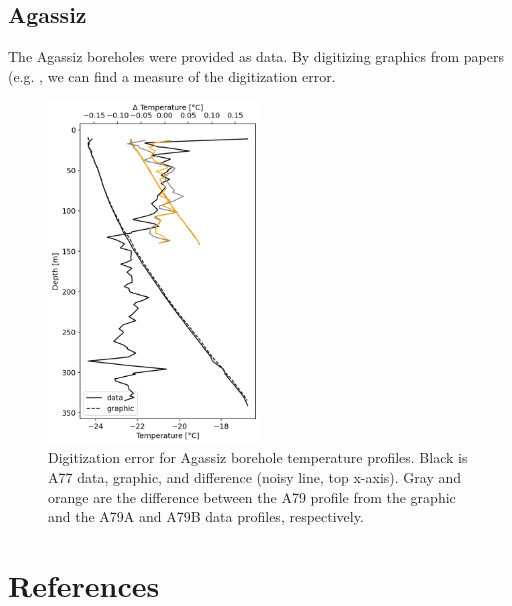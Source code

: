 \documentclass[article,a4paper,times,11pt,twoside]{article}
\begin{document}
\subsection{Agassiz}
\label{sec:orgb99afac}

The Agassiz boreholes were provided as data. By digitizing graphics from papers (e.g. \textcite{clarke_1987_wind}, we can find a measure of the digitization error.

\begin{figure}[!h]
\centering
\includegraphics[width=0.5\textwidth]{./fig/agassiz_diff.png}
\caption{\label{fig:err_agassiz}Digitization error for Agassiz borehole temperature profiles. Black is A77 data, graphic, and difference (noisy line, top x-axis). Gray and orange are the difference between the \textcite{clarke_1987_wind} A79 profile from the graphic and the A79A and A79B data profiles, respectively.}
\end{figure}

\clearpage
\section{References}
\label{sec:org0de6e5b}
\printbibliography[heading=none]
\end{document}
